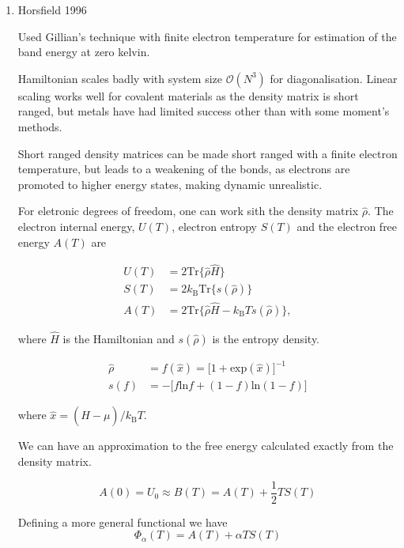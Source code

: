 \documentclass[11pt]{article}
\begin{document}
\begin{enumerate}
\begin{enumerate}
\item Horsfield 1996
\label{sec:org91b7d6b}
\cite{Horsfield1996}

Used Gillian's technique \cite{Gillan1989} with finite electron temperature for estimation of
the band energy at zero kelvin. 


Hamiltonian scales badly with system size \(\mathcal{O}(N^3)\) for
diagonalisation. Linear scaling works well for covalent materials as the
density matrix is short ranged, but metals have had limited success other than
with some moment's methods.

Short ranged density matrices can be made short ranged with a finite electron
temperature, but leads to a weakening of the bonds, as electrons are promoted
to higher energy states, making dynamic unrealistic. 

For eletronic degrees of freedom, one can work sith the density matrix
\(\hat{\rho}\). The electron internal energy, \(U(T)\), electron entropy \(S(T)\)
and the electron free energy \(A(T)\) are 

\begin{LaTeX}
\begin{align}
U(T) &= 2 \text{Tr}\{ \hat{\rho} \hat{H} \} \\
S(T) &= 2 k_{\text{B}} \text{Tr}\{ s( \hat{\rho} ) \} \\
A(T) &= 2 \text{Tr}\{ \hat{\rho} \hat{H} - k_{\text{B}} T s( \hat{\rho} ) \},
\end{align}
\end{LaTeX}

where \(\hat{H}\) is the Hamiltonian and \(s(\hat{\rho})\) is the entropy density.

\begin{LaTeX}
\begin{align}
\hat{\rho} &= f(\hat{x}) = \big[ 1 + \text{exp}(\hat{x}) \big]^{-1} \\
s(f) &= - \big[ f\text{ln}f + (1-f)\text{ln}(1-f) \big] 
\end{align}
\end{LaTeX}

where \(\hat{x} = ( \hat{H} - \mu )/k_{\text{B}} T\).

We can have an approximation to the free energy calculated exactly from the
density matrix.

\[
A(0) = U_{0} \approx B(T) = A(T) + \frac{1}{2} T S(T)
\]

Defining a more general functional we have 
\[
\Phi_{\alpha}(T) = A(T) + \alpha T S(T)
\]


\end{enumerate}
\end{enumerate}
\end{document}
